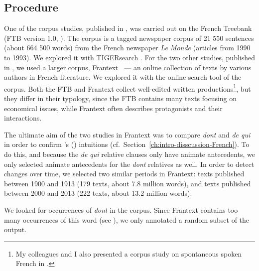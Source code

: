 \subsection{Procedure}

One of the corpus studies, published in \citet{Abeille.2016}, was carried out on the French Treebank (FTB version 1.0, \citealt{Abeille.2019.FTB}). The corpus is a tagged newspaper corpus of 21 550 sentences (about 664 500 words) from the French newspaper \emph{Le Monde} (articles from 1990 to 1993). We explored it with TIGERsearch \citep{Tiger}. For the two other studies, published in \citet{Abeille.2020.JFLS}, we used a larger corpus, Frantext \citep{Frantext}~--- an online collection of texts by various authors in French literature. We explored it with the online search tool of the corpus. Both the FTB and Frantext collect well-edited written productions\footnote{My colleagues and I also presented a corpus study on spontaneous spoken French in \citet{Abeille.2016}.}, but they differ in their typology, since the FTB contains many texts focusing on economical issues, while Frantext often describes protagonists and their interactions. 

The ultimate aim of the two studies in Frantext was to compare \emph{dont} and \emph{de qui} in order to confirm \citeauthor{Tellier.1990}'s (\citeyear{Tellier.1990,Tellier.1991}) intuitions (cf.\ Section~\ref{ch:intro-disscussion-French}). To do this, and because the \emph{de qui} relative clauses only have animate antecedents, we only selected animate antecedents for the \emph{dont} relatives as well. In order to detect changes over time, we selected two similar periods in Frantext: texts published between 1900 and 1913 (179 texts, about 7.8 million words), and texts published between 2000 and 2013 (222 texts, about 13.2 million words).

We looked for occurrences of \emph{dont} in the corpus. Since Frantext contains too many occurrences of this word (see ), we only annotated a random subset of the output.

